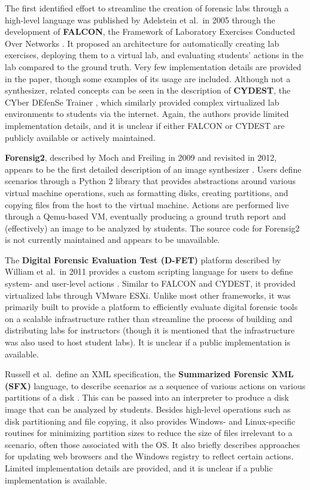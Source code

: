\documentclass[letterpaper,12pt]{report}
\begin{document}
The first identified effort to streamline the creation of forensic labs
through a high-level language was published by Adelstein et al.~in 2005
through the development of \textbf{FALCON}, the Framework of Laboratory
Exercises Conducted Over Networks
\cite{adelsteinAutomaticallyCreatingRealistic2005}. It proposed an
architecture for automatically creating lab exercises, deploying them to
a virtual lab, and evaluating students' actions in the lab compared to
the ground truth. Very few implementation details are provided in the
paper, though some examples of its usage are included. Although not a
synthesizer, related concepts can be seen in the description of
\textbf{CYDEST}, the CYber DEfenSe Trainer
\cite{bruecknerAutomatedComputerForensics2008}, which similarly
provided complex virtualized lab environments to students via the
internet. Again, the authors provide limited implementation details, and
it is unclear if either FALCON or CYDEST are publicly available or
actively maintained.

\textbf{Forensig2}, described by Moch and Freiling in 2009 and revisited
in 2012, appears to be the first detailed description of an image
synthesizer
\cite{mochForensicImageGenerator2009,mochEvaluatingForensicImage2012}.
Users define scenarios through a Python 2 library that provides
abstractions around various virtual machine operations, such as
formatting disks, creating partitions, and copying files from the host
to the virtual machine. Actions are performed live through a Qemu-based
VM, eventually producing a ground truth report and (effectively) an
image to be analyzed by students. The source code for Forensig2 is not
currently maintained and appears to be unavailable.

The \textbf{Digital Forensic Evaluation Test (D-FET)} platform described
by William et al.~in 2011 provides a custom scripting language for users
to define system- and user-level actions
\cite{williamCloudbasedDigitalForensics2011}. Similar to FALCON and
CYDEST, it provided virtualized labs through VMware ESXi. Unlike most
other frameworks, it was primarily built to provide a platform to
efficiently evaluate digital forensic tools on a scalable infrastructure
rather than streamline the process of building and distributing labs for
instructors (though it is mentioned that the infrastructure was also
used to host student labs). It is unclear if a public implementation is
available.

Russell et al.~define an XML specification, the \textbf{Summarized
Forensic XML (SFX)} language, to describe scenarios as a sequence of
various actions on various partitions of a disk
\cite{russellForensicImageDescription2012}. This can be passed into
an interpreter to produce a disk image that can be analyzed by students.
Besides high-level operations such as disk partitioning and file
copying, it also provides Windows- and Linux-specific routines for
minimizing partition sizes to reduce the size of files irrelevant to a
scenario, often those associated with the OS. It also briefly describes
approaches for updating web browsers and the Windows registry to reflect
certain actions. Limited implementation details are provided, and it is
unclear if a public implementation is available.
\end{document}
